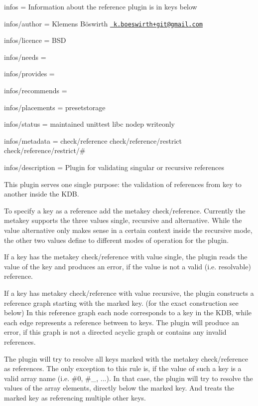 
\begin{DoxyItemize}
\item infos = Information about the reference plugin is in keys below
\item infos/author = Klemens Böswirth \href{mailto:k.boeswirth+git@gmail.com}{\texttt{ k.\+boeswirth+git@gmail.\+com}}
\item infos/licence = B\+SD
\item infos/needs =
\item infos/provides =
\item infos/recommends =
\item infos/placements = presetstorage
\item infos/status = maintained unittest libc nodep writeonly
\item infos/metadata = check/reference check/reference/restrict check/reference/restrict/\#
\item infos/description = Plugin for validating singular or recursive references
\end{DoxyItemize}

This plugin serves one single purpose\+: the validation of references from key to another inside the K\+DB.

To specify a key as a reference add the metakey {\ttfamily check/reference}. Currently the metakey supports the three values {\ttfamily single}, {\ttfamily recursive} and {\ttfamily alternative}. While the value {\ttfamily alternative} only makes sense in a certain context inside the {\ttfamily recursive} mode, the other two values define to different modes of operation for the plugin.

If a key has the metakey {\ttfamily check/reference} with value {\ttfamily single}, the plugin reads the value of the key and produces an error, if the value is not a valid (i.\+e. resolvable) reference.

If a key has metakey {\ttfamily check/reference} with value {\ttfamily recursive}, the plugin constructs a reference graph starting with the marked key. (for the exact construction see below) In this reference graph each node corresponds to a key in the K\+DB, while each edge represents a reference between to keys. The plugin will produce an error, if this graph is not a directed acyclic graph or contains any invalid references.

The plugin will try to resolve all keys marked with the metakey {\ttfamily check/reference} as references. The only exception to this rule is, if the value of such a key is a valid array name (i.\+e. {\ttfamily \#0}, {\ttfamily \#\+\_}, ...). In that case, the plugin will try to resolve the values of the array elements, directly below the marked key. And treats the marked key as referencing multiple other keys.

